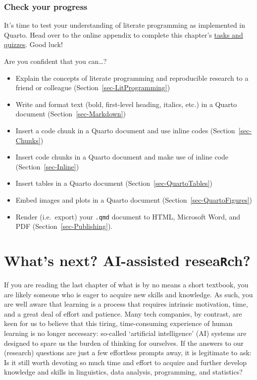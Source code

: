 \documentclass[
  letterpaper,
  DIV=11,
  numbers=noendperiod]{scrreprt}
\providecommand{\tightlist}{%
  \setlength{\itemsep}{0pt}\setlength{\parskip}{0pt}}
\begin{document}
\subsection*{Check your progress}\label{check-your-progress-27}

It's time to test your understanding of literate programming as
implemented in Quarto. Head over to the online appendix to complete this
chapter's
\href{https://elenlefoll.github.io/RstatsTextbook/quizzes/14_quiz.html}{tasks
and quizzes}. Good luck!~

Are you confident that you can\ldots?

\begin{itemize}
\tightlist
\item[$\square$]
  Explain the concepts of literate programming and reproducible research
  to a friend or colleague (Section~\ref{sec-LitProgramming})
\item[$\square$]
  Write and format text (bold, first-level heading, italics, etc.) in a
  Quarto document (Section~\ref{sec-Markdown})
\item[$\square$]
  Insert a code chunk in a Quarto document and use inline codes
  (Section~\ref{sec-Chunks})
\item[$\square$]
  Insert code chunks in a Quarto document and make use of inline code
  (Section~\ref{sec-Inline})
\item[$\square$]
  Insert tables in a Quarto document (Section~\ref{sec-QuartoTables})
\item[$\square$]
  Embed images and plots in a Quarto document
  (Section~\ref{sec-QuartoFigures})
\item[$\square$]
  Render (i.e.~export) your \texttt{.qmd} document to HTML, Microsoft
  Word, and PDF (Section~\ref{sec-Publishing}).
\end{itemize}


\chapter{\texorpdfstring{What's next? AI-assisted
resea\texttt{R}ch?}{What's next? AI-assisted reseaRch?}}\label{sec-AI}

If you are reading the last chapter of what is by no means a short
textbook, you are likely someone who is eager to acquire new skills and
knowledge. As such, you are well aware that learning is a process that
requires intrinsic motivation, time, and a great deal of effort and
patience. Many tech companies, by contrast, are keen for us to believe
that this tiring, time-consuming experience of human learning is no
longer necessary: so-called `artificial intelligence' (AI) systems are
designed to spare us the burden of thinking for ourselves. If the
answers to our (research) questions are just a few effortless prompts
away, it is legitimate to ask: Is it still worth devoting so much time
and effort to acquire and further develop knowledge and skills in
linguistics, data analysis, programming, and statistics?
\end{document}
